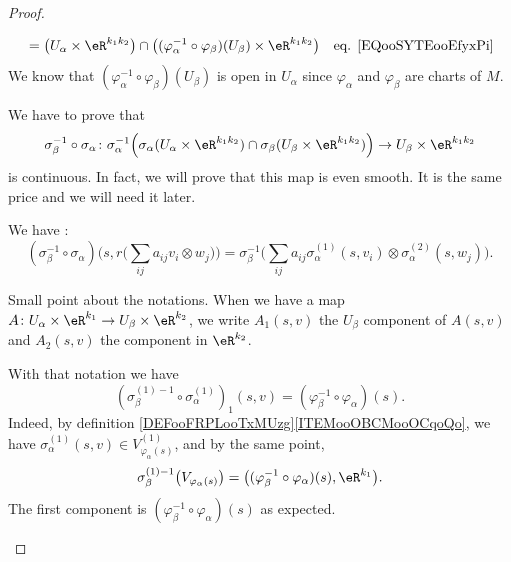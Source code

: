 \begin{proof}
\begin{subproof}
\begin{subequations}
\begin{align}
				 & = \big( U_{\alpha}\times \eR^{k_1k_2} \big) \cap \big(   (\varphi_{\alpha}^{-1}\circ\varphi_{\beta})(U_{\beta})   \times \eR^{k_1k_2} \big)                                                                            & \text{eq. \eqref{EQooSYTEooEfyxPi}}    \\
			\end{align}
		\end{subequations}
		We know that \( (\varphi_{\alpha}^{-1}\circ\varphi_{\beta})(U_\beta)\) is open in \( U_{\alpha}\) since \( \varphi_{\alpha}\) and \( \varphi_{\beta}\) are charts of \( M\).


		We have to prove that
		\begin{equation}	\label{EQooVKUBooKuLAnX}
			\sigma_{\beta}^{-1}\circ\sigma_{\alpha}  \colon  \sigma_{\alpha}^{-1}\Big( \sigma_{\alpha}(U_{\alpha}\times \eR^{k_1k_2})\cap \sigma_{\beta}(U_{\beta}\times \eR^{k_1k_2}) \Big)      \to  U_{\beta}\times \eR^{k_1k_2}
		\end{equation}
		is continuous. In fact, we will prove that this map is even smooth. It is the same price and we will need it later.

		\begin{subproof}

			We have :
			\begin{equation}		\label{EQooNROCooARFfPa}
				(\sigma_{\beta}^{-1}\circ \sigma_{\alpha})\Big( s,r\big( \sum_{ij}a_{ij}v_i\otimes w_j \big)\Big)
				=\sigma_{\beta}^{-1}\Big( \sum_{ij}a_{ij}\sigma_{\alpha}^{(1)}(s,v_i)\otimes \sigma_{\alpha}^{(2)}(s,w_j) \Big).
			\end{equation}

			Small point about the notations. When we have a map \(A \colon U_{\alpha}\times \eR^{k_1}\to U_{\beta}\times \eR^{k_2}  \), we write \( A_1(s,v)\) the \( U_{\beta}\) component of \( A(s,v)\) and \( A_2(s,v)\) the component in \( \eR^{k_2}\).

			With that notation we have
			\begin{equation}		\label{EQooSBLDooRxPKQR}
				(\sigma_{\beta}^{(1)-1}\circ\sigma_{\alpha}^{(1)})_1(s,v)=(\varphi_{\beta}^{-1}\circ \varphi_{\alpha})(s).
			\end{equation}
			Indeed, by definition \ref{DEFooFRPLooTxMUzg}\ref{ITEMooOBCMooOCqoQo}, we have \( \sigma_{\alpha}^{(1)}(s,v)\in V_{\varphi_{\alpha}(s)}^{(1)}\), and by the same point,
			\begin{equation}
				\sigma_{\beta}^{(1)-1}\big( V_{\varphi_{\alpha}(s)} \big)=\big( (\varphi_{\beta}^{-1}\circ\varphi_{\alpha})(s), \eR^{k_1} \big).
			\end{equation}
			The first component is \( (\varphi_{\beta}^{-1}\circ \varphi_{\alpha})(s)\) as expected.


\end{subproof}
\end{subproof}
\end{proof}

